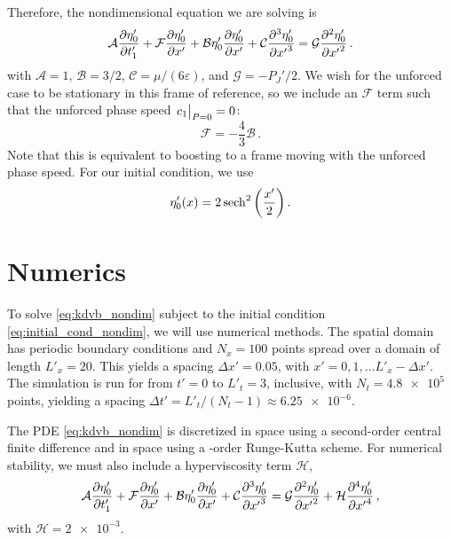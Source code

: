\documentclass{jfm}
\renewcommand*{\epsilon}{\varepsilon}
\begin{document}
Therefore, the nondimensional equation we are solving is
\begin{equation}
  \mathcal{A} \pdv{\eta'_0}{t'_1} + \mathcal{F} \pdv{\eta'_0}{x'} + \mathcal{B}
  \eta'_0 \pdv{\eta'_0}{x'} + \mathcal{C} \pdv[3]{\eta'_0}{{x'}} =
  \mathcal{G} \pdv[2]{\eta'_0}{{x'}} \,.
  \label{eq:kdvb_nondim}
\end{equation}
with $\mathcal{A} = 1$, $\mathcal{B} = 3/2$, $\mathcal{C} =
\mu/(6\epsilon)$, and $\mathcal{G} = -P_J'/2$.
We wish for the unforced case to be stationary in this frame of
reference, so we include an $\mathcal{F}$ term such that the unforced
phase speed $\eval{c_1}_{P=0} = 0$:
\begin{equation}
  \mathcal{F} = -\frac{4}{3} \mathcal{B} \,.
\end{equation}
Note that this is equivalent to boosting to a frame moving with the
unforced phase speed.
For our initial condition, we use
\begin{equation}
  \eta'_0(x) = 2 \sech^2\pqty{\frac{x'}{2}} \,.
  \label{eq:initial_cond_nondim}
\end{equation}

\section{Numerics}
To solve \cref{eq:kdvb_nondim} subject to the initial condition
\cref{eq:initial_cond_nondim}, we will use numerical methods.
The spatial domain has periodic boundary conditions and $N_x = 100$
points spread over a domain of length $L'_x = 20$.
This yields a spacing $\Delta x' = 0.05$, with $x' = 0, 1, \ldots L'_x -
\Delta x'$.
The simulation is run for from $t'= 0$ to $L'_t = 3$, inclusive, with
$N_t = \num{4.8e5}$ points, yielding a spacing $\Delta t' = L'_t/(N_t-1)
\approx \num{6.25e-6}$.

The PDE \cref{eq:kdvb_nondim} is discretized in space using a
second-order central finite difference and in space using a
-order Runge-Kutta scheme.
For numerical stability, we must also include a hyperviscosity term
$\mathcal{H}$,
\begin{equation}
  \mathcal{A} \pdv{\eta'_0}{t'_1} + \mathcal{F} \pdv{\eta'_0}{x'} + \mathcal{B}
  \eta'_0 \pdv{\eta'_0}{x'} + \mathcal{C} \pdv[3]{\eta'_0}{{x'}} =
  \mathcal{G} \pdv[2]{\eta'_0}{{x'}} + \mathcal{H}
  \pdv[4]{\eta'_0}{{x'}} \,,
\end{equation}
with $\mathcal{H} = \num{2e-3}$.
\end{document}
